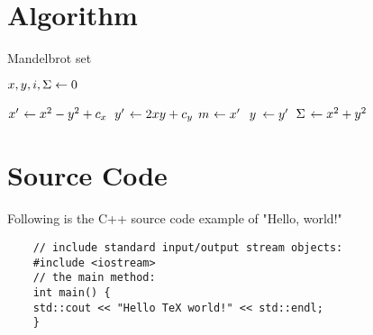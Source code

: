 \documentclass{article}
\newcommand{\minbox}[2]{%
    \mathmakebox[\ifdim#1<\width\width\else#1\fi]{#2}}
\newcommand{\Let}[2]{\State $ \minbox{1em}{#1} \gets #2 $}
\begin{document}
\section{Algorithm}

\begin{algorithm}
    \caption{Mandelbrot set}
\label{alg:mandelbrot}
\begin{algorithmic}[1]



    \Let{x, y, i, \Sigma}{0}

    \Let{x^\prime}{x^2 - y^2 + c_x}
    \Let{y^\prime}{2xy + c_y}
    \Let{m}{x^\prime}
    \Let{y}{y^\prime}
    \Let{\Sigma}{x^2 + y^2}
    \EndWhile

    \State {}
    \EndIf

    \State {}
    \EndFunction
    \end{algorithmic}
\end{algorithm}


\section{Source Code}
Following is the C++ source code example of "Hello, world!"

\begin{lstlisting}
    // include standard input/output stream objects:
    #include <iostream>
    // the main method:
    int main() {
    std::cout << "Hello TeX world!" << std::endl;
    }
\end{lstlisting}
\end{document}
